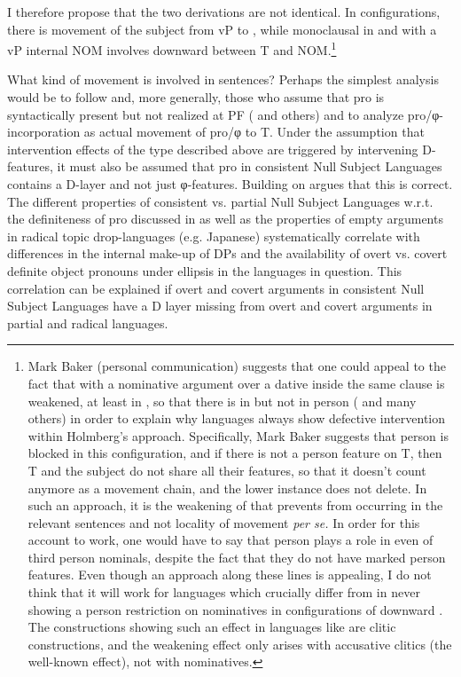 \documentclass[output=paper]{LSP/langsci}
\begin{document}
I therefore propose that the two derivations are not identical. In  configurations, there is movement of the subject from vP to , while monoclausal  in  and  with a vP internal NOM involves downward  between T and NOM.\footnote{Mark Baker (personal communication) suggests that one could appeal to the fact that  with a nominative argument over a dative inside the same clause is weakened, at least in , so that there is  in  but not in person (\citealt{Taraldsen1995,Sigurðsson1996} and many others) in order to explain why  languages always show defective intervention within Holmberg’s  approach. Specifically, Mark Baker suggests that person  is blocked in this configuration, and if there is not a person feature on T, then T and the subject do not share all their features, so that it doesn’t count anymore as a movement chain, and the lower instance does not delete. In such an approach, it is the weakening of  that prevents  from occurring in the relevant sentences and not locality of movement \textit{per se.} In order for this account to work, one would have to say that person plays a role in  even of third person nominals, despite the fact that they do not have marked person features. Even though an approach along these lines is appealing, I do not think that it will work for  languages which crucially differ from  in never showing a person restriction on nominatives in configurations of downward . The constructions showing such an effect in languages like  are clitic constructions, and the weakening effect only arises with accusative clitics (the well-known  effect), not with nominatives.} 

What kind of movement is involved in  sentences? Perhaps the simplest analysis would be to follow \citet{Holmberg2010Null} and, more generally, those who assume that pro is syntactically present but not realized at PF (\citealt{Rizzi1986,CardinalettiStarke1999,Roberts2010} and others) and to analyze pro/φ-in\-cor\-po\-ration as actual movement of pro/φ to T. Under the assumption that intervention effects of the type described above are triggered by intervening D-features, it must also be assumed that pro in consistent Null Subject Languages contains a D-layer and not just φ-features. Building on \citet{Tomioka2003,Barbosa2013} argues that this is correct. The different properties of consistent vs. partial Null Subject Languages w.r.t. the definiteness of pro discussed in \citet{Holmberg2010Null} as well as the properties of empty arguments in radical topic drop-lan\-guages (e.g. Japanese) systematically correlate with differences in the internal make-up of DPs and the availability of overt vs. covert definite object pronouns under ellipsis in the languages in question. This correlation can be explained if overt and covert arguments in consistent Null Subject Languages have a D layer missing from overt and covert arguments in partial and radical  languages. 
\end{document}
